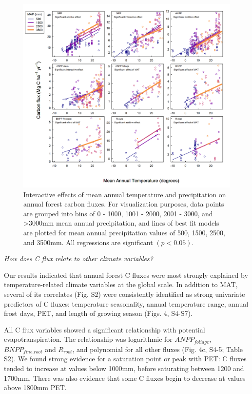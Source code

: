 \documentclass[
]{article}
\begin{document}
\begin{figure}[H]
\includegraphics[width=1\linewidth]{mat_map_interaction} \caption{Interactive effects of mean annual temperature and precipitation on annual forest carbon fluxes. For visualization purposes, data points are grouped into bins of 0 - 1000, 1001 - 2000, 2001 - 3000, and >3000mm mean annual precipitation, and lines of best fit models are plotted for mean annual precipitation values of 500, 1500, 2500, and 3500mm. All regressions are significant $(p<0.05)$.}\label{fig:unnamed-chunk-8}
\end{figure}

\emph{How does C flux relate to other climate variables?}

Our results indicated that annual forest C fluxes were most strongly
explained by temperature-related climate variables at the global scale.
In addition to MAT, several of its correlates (Fig. S2) were
consistently identified as strong univariate predictors of C fluxes:
temperature seasonality, annual temperature range, annual frost days,
PET, and length of growing season (Figs. 4, S4-S7).

All C flux variables showed a significant relationship with potential
evapotranspiration. The relationship was logarithmic for
\(ANPP_{foliage}\), \(BNPP_{fine.root}\) and \(R_{root}\), and
polynomial for all other fluxes (Fig. 4c, S4-5; Table S2). We found
strong evidence for a saturation point or peak with PET: C fluxes tended
to increase at values below 1000mm, before saturating between 1200 and
1700mm. There was also evidence that some C fluxes begin to decrease at
values above 1800mm PET.
\end{document}

